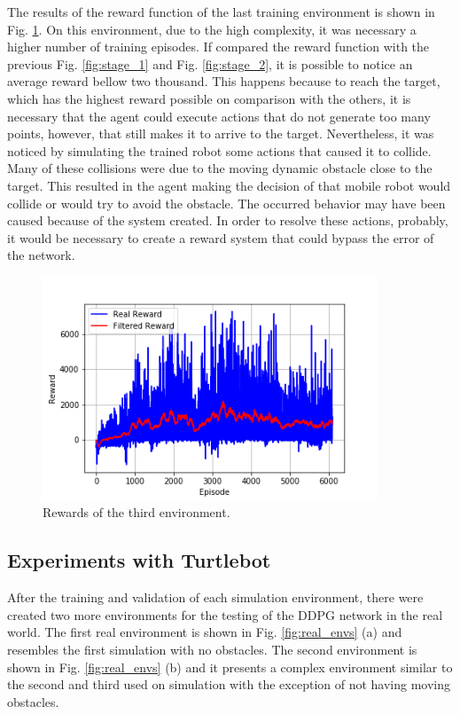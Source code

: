 The results of the reward function of the last training environment is shown in Fig. \ref{fig:stage_4}.
On this environment, due to the high complexity, it was necessary a higher number of training episodes.
If compared the reward function with the previous Fig. \ref{fig:stage_1} and Fig. \ref{fig:stage_2}, it is possible to notice an average reward bellow two thousand.
This happens because to reach the target, which has the highest reward possible on comparison with the others, it is necessary that the agent could execute actions that do not generate too many points, however, that still makes it to arrive to the target.
Nevertheless, it was noticed by simulating the trained robot some actions that caused it to collide.
Many of these collisions were due to the moving dynamic obstacle close to the target.
This resulted in the agent making the decision of that mobile robot would collide or would try to avoid the obstacle.
The occurred behavior may have been caused because of the system created.
In order to resolve these actions, probably, it would be necessary to create a reward system that could bypass the error of the network.

\begin{figure}[H]
\centerline{\includegraphics[width=10cm]{images/stage_4.png}}
\caption{Rewards of the third environment.}
\label{fig:stage_4}
\end{figure}

\subsection*{Experiments with Turtlebot}

After the training and validation of each simulation environment, there were created two more environments for the testing of the DDPG network in the real world.
The first real environment is shown in Fig. \ref{fig:real_envs} (a) and resembles the first simulation with no obstacles. The second environment is shown in Fig. \ref{fig:real_envs} (b) and it presents a complex environment similar to the second and third used on simulation with the exception of not having moving obstacles.

